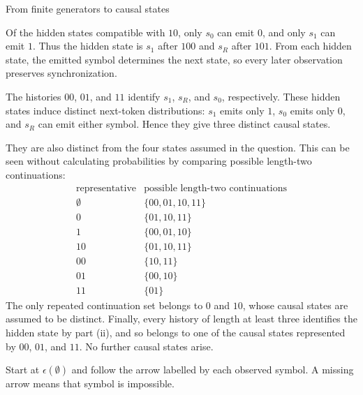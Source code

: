 \begin{exercise}[Extension]{From finite generators to causal states}
\begin{solution}
\begin{parts}
\begin{subparts}
          \item Of the hidden states compatible with $10$, only $s_0$ can emit
            $0$, and only $s_1$ can emit $1$. Thus the hidden state is $s_1$
            after $100$ and $s_R$ after $101$. From each hidden state,
            the emitted symbol determines the next state, so every
            later observation preserves synchronization.

          \item The histories $00$, $01$, and $11$ identify $s_1$, $s_R$,
            and $s_0$, respectively. These hidden states induce distinct next-token
            distributions: $s_1$ emits only $1$, $s_0$ emits only $0$, and
            $s_R$ can emit either symbol. Hence they give three distinct causal
            states.

            They are also distinct from the four states assumed in the
            question. This can be seen without calculating probabilities by
            comparing possible length-two continuations:
            \[
              \begin{array}{c|c}
                \text{representative} & \text{possible length-two continuations}\\
                \hline
                \emptyset & \{00,01,10,11\}\\
                0          & \{01,10,11\}\\
                1          & \{00,01,10\}\\
                10         & \{01,10,11\}\\
                00         & \{10,11\}\\
                01         & \{00,10\}\\
                11         & \{01\}
              \end{array}
            \]
            The only repeated continuation set belongs to $0$ and $10$, whose
            causal states are assumed to be distinct. Finally, every history
            of length at least three identifies the hidden state by part (ii), and so
            belongs to one of the causal states represented by $00$, $01$, and $11$.
            No further causal states arise.

            Start at $\epsilon(\emptyset)$ and follow the arrow labelled by
            each observed symbol. A missing arrow means that symbol is impossible.
            \par\nobreak
            {\centering
              }
\end{subparts}
\end{parts}
\end{solution}
\end{exercise}
